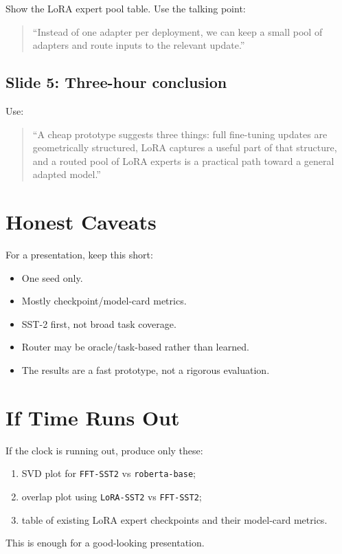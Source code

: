\documentclass[11pt]{article}
\begin{document}
Show the LoRA expert pool table. Use the talking point:
\begin{quote}
``Instead of one adapter per deployment, we can keep a small pool of adapters and route inputs to the relevant update.''
\end{quote}

\subsection{Slide 5: Three-hour conclusion}

Use:
\begin{quote}
``A cheap prototype suggests three things: full fine-tuning updates are geometrically structured, LoRA captures a useful part of that structure, and a routed pool of LoRA experts is a practical path toward a general adapted model.''
\end{quote}

\section{Honest Caveats}

For a presentation, keep this short:
\begin{itemize}
    \item One seed only.
    \item Mostly checkpoint/model-card metrics.
    \item SST-2 first, not broad task coverage.
    \item Router may be oracle/task-based rather than learned.
    \item The results are a fast prototype, not a rigorous evaluation.
\end{itemize}

\section{If Time Runs Out}

If the clock is running out, produce only these:
\begin{enumerate}
    \item SVD plot for \texttt{FFT-SST2} vs \texttt{roberta-base};
    \item overlap plot using \texttt{LoRA-SST2} vs \texttt{FFT-SST2};
    \item table of existing LoRA expert checkpoints and their model-card metrics.
\end{enumerate}

This is enough for a good-looking presentation.
\end{document}
